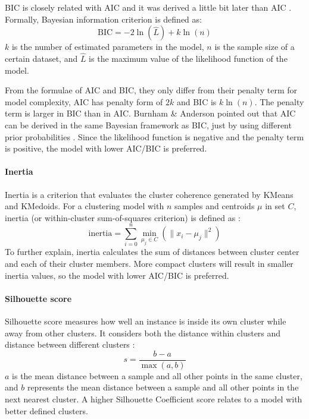 \documentclass[a4paper]{article}
\begin{document}
BIC is closely related with AIC and it was derived a little bit later than AIC \cite{BIC}. Formally, Bayesian information criterion is defined as:
\begin{equation}
    \text{BIC}=-2\ln(\hat{L})+k\ln(n)
    \label{Eq: BIC}
\end{equation}
\noindent \(k\) is the number of estimated parameters in the model, \(n\) is the sample size of a certain dataset, and \(\hat{L}\) is the maximum value of the likelihood function of the model.

From the formulae of AIC and BIC, they only differ from their penalty term for model complexity, AIC has penalty form of \(2k\) and BIC is \(k\ln(n)\). The penalty term is larger in BIC than in AIC. Burnham \& Anderson pointed out that AIC can be derived in the same Bayesian framework as BIC, just by using different prior probabilities \cite{AIC_BIC_comparison}\cite{AIC_BIC_book}. Since the likelihood function is negative and the penalty term is positive, the model with lower AIC/BIC is preferred.

\paragraph{Inertia}
Inertia is a criterion that evaluates the cluster coherence generated by KMeans and KMedoids. For a clustering model with \(n\) samples and centroids \(\mu\) in set \(C\), inertia (or within-cluster sum-of-squares criterion) is defined as \cite{scikit-learn}:
\begin{equation}
    \text{inertia}=\sum_{i=0}^{n}\min_{\mu_{j} \in C} \left( \parallel x_i - \mu_j\parallel^2 \right)
\end{equation}
\noindent To further explain, inertia calculates the sum of distances between cluster center and each of their cluster members. More compact clusters will result in smaller inertia values, so the model with lower AIC/BIC is preferred.

\paragraph{Silhouette score}
Silhouette score measures how well an instance is inside its own cluster while away from other clusters. It considers both the distance within clusters and distance between different clusters \cite{scikit-learn}:
\begin{equation}
    s = \frac{b-a}{\max(a, b)}
\end{equation}
\noindent \(a\) is the mean distance between a sample and all other points in the same cluster, and \(b\) represents the mean distance between a sample and all other points in the next nearest cluster. A higher Silhouette Coefficient score relates to a model with better defined clusters. 
\end{document}
